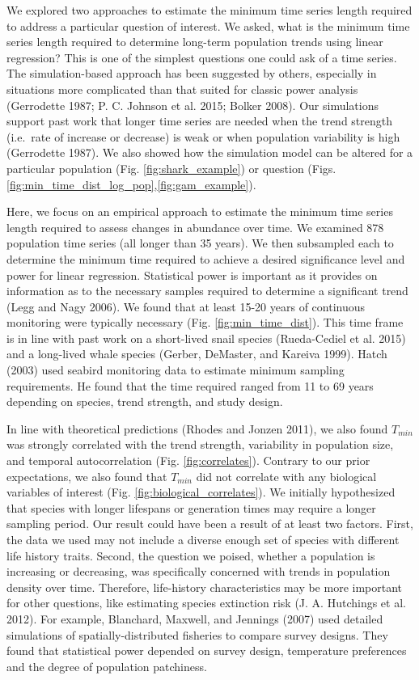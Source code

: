 \documentclass[12pt,]{article}
\begin{document}
We explored two approaches to estimate the minimum time series length
required to address a particular question of interest. We asked, what is
the minimum time series length required to determine long-term
population trends using linear regression? This is one of the simplest
questions one could ask of a time series. The simulation-based approach
has been suggested by others, especially in situations more complicated
than that suited for classic power analysis (Gerrodette 1987; P. C.
Johnson et al. 2015; Bolker 2008). Our simulations support past work
that longer time series are needed when the trend strength (i.e.~rate of
increase or decrease) is weak or when population variability is high
(Gerrodette 1987). We also showed how the simulation model can be
altered for a particular population (Fig. \ref{fig:shark_example}) or
question (Figs. \ref{fig:min_time_dist_log_pop},\ref{fig:gam_example}).

Here, we focus on an empirical approach to estimate the minimum time
series length required to assess changes in abundance over time. We
examined 878 population time series (all longer than 35 years). We then
subsampled each to determine the minimum time required to achieve a
desired significance level and power for linear regression. Statistical
power is important as it provides on information as to the necessary
samples required to determine a significant trend (Legg and Nagy 2006).
We found that at least 15-20 years of continuous monitoring were
typically necessary (Fig. \ref{fig:min_time_dist}). This time frame is
in line with past work on a short-lived snail species (Rueda-Cediel et
al. 2015) and a long-lived whale species (Gerber, DeMaster, and Kareiva
1999). Hatch (2003) used seabird monitoring data to estimate minimum
sampling requirements. He found that the time required ranged from 11 to
69 years depending on species, trend strength, and study design.

In line with theoretical predictions (Rhodes and Jonzen 2011), we also
found \(T_{min}\) was strongly correlated with the trend strength,
variability in population size, and temporal autocorrelation (Fig.
\ref{fig:correlates}). Contrary to our prior expectations, we also found
that \(T_{min}\) did not correlate with any biological variables of
interest (Fig. \ref{fig:biological_correlates}). We initially
hypothesized that species with longer lifespans or generation times may
require a longer sampling period. Our result could have been a result of
at least two factors. First, the data we used may not include a diverse
enough set of species with different life history traits. Second, the
question we poised, whether a population is increasing or decreasing,
was specifically concerned with trends in population density over time.
Therefore, life-history characteristics may be more important for other
questions, like estimating species extinction risk (J. A. Hutchings et
al. 2012). For example, Blanchard, Maxwell, and Jennings (2007) used
detailed simulations of spatially-distributed fisheries to compare
survey designs. They found that statistical power depended on survey
design, temperature preferences and the degree of population patchiness.
\end{document}
